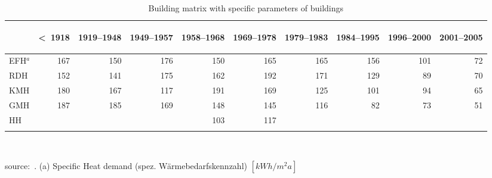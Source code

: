 \begin{table}[htbp]
  \centering
  \caption{Building matrix with specific parameters of
  buildings}\label{tab:BW}%
    \begin{tabular}{l r rrrrrrrr}
    \addlinespace
    \toprule
    &
    \begin{sideways}\textless~1918	\end{sideways}&  
    \begin{sideways}1919--1948   \end{sideways}&  
    \begin{sideways}1949--1957   \end{sideways}&  
    \begin{sideways}1958--1968   \end{sideways}&  
    \begin{sideways}1969--1978   \end{sideways}&  
    \begin{sideways}1979--1983   \end{sideways}&  
    \begin{sideways}1984--1995   \end{sideways}&  
    \begin{sideways}1996--2000   \end{sideways}&  
    \begin{sideways}2001--2005   \end{sideways}\\
    \midrule
EFH$^a$&167&  150&  176&   150&   165&165& 156& 101&  72\\
RDH&    152&  141&  175&   162&   192&171& 129&  89&  70\\
KMH&    180&  167&  117&   191&   169&125& 101&  94&  65\\
GMH&    187&  185&  169&   148&   145&116&  82&  73&  51\\
HH &       &     &     &   103&   117&   &    &    &     \\
    \bottomrule
    \addlinespace
    \end{tabular}\\
    \begin{footnotesize}    
    source:~\cite{Blesl.2007}.
    (a) Specific Heat demand (spez. W\"armebedarfskennzahl)
    $[kWh/m^{2}a]$\\
    
    \end{footnotesize}
\end{table}
